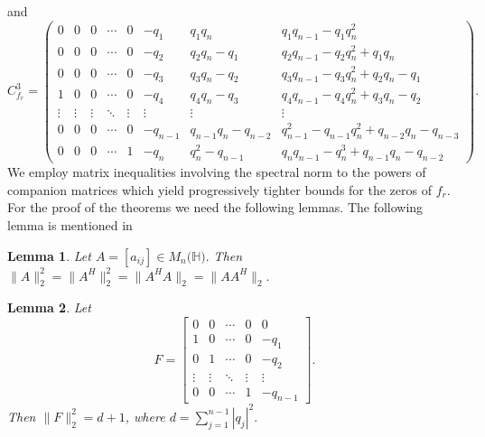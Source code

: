 \documentclass [12pt]{article}
\newtheorem{lemma}{Lemma}
\begin{document}
and
\[
C^{3}_{f_{r}} = 
\begin{pmatrix}
0 & 0 & 0 & \cdots &0& -q_{1}&q_{1}q_{n}&q_{1}q_{n-1}-q_{1}q^{2}_{n} \\
0 & 0 & 0 & \cdots &0& -q_{2} &q_{2}q_{n}-q_{1}&q_{2}q_{n-1}-q_{2}q^{2}_{n}+q_{1}q_{n}\\
0 & 0 & 0 & \cdots &0& -q_{3} &q_{3}q_{n}-q_{2}&q_{3}q_{n-1}-q_{3}q^{2}_{n}+q_{2}q_{n}-q_{1}\\
1&0&0&\cdots&0&-q_{4}&q_{4}q_{n}-q_{3}&q_{4}q_{n-1}-q_{4}q^{2}_{n}+q_{3}q_{n}-q_{2}\\
\vdots & \vdots & \vdots & \ddots & \vdots&\vdots&\vdots&\vdots \\
0 & 0 & 0 & \cdots &0 & -q_{n-1} &q_{n-1}q_{n}-q_{n-2}&q^{2}_{n-1}-q_{n-1}q^{2}_{n}+q_{n-2}q_{n}-q_{n-3}\\
0 & 0 & 0 & \cdots &1 & -q_{n} & q^{2}_{n}-q_{n-1}&q_{n}q_{n-1}-q^{3}_{n}+q_{n-1}q_{n}-q_{n-2}
\end{pmatrix}.
\] 
We employ matrix inequalities involving the spectral norm to the powers of  companion matrices which yield progressively tighter bounds for the zeros of $f_{r}.$\\


\noindent For the proof of the theorems we need the following lemmas. The following lemma is mentioned in \cite{ASS}
\begin{lemma}{\label{lemma 1}}
    Let $A= [a_{ij}]\in M_{n}(\mathbb{H)}.$ Then $\|A\|^2_{2}=\|A^{H}\|^{2}_{2}=\|A^{H}A\|_{2}=\|AA^{H}\|_{2}.$
\end{lemma}
\begin{lemma}{\label{lemma 2}}
    Let 
    \[F = 
\begin{bmatrix}
0 & 0 & \cdots & 0 & 0 \\
1 & 0 & \cdots & 0 & -q_{1} \\
0 & 1 & \cdots & 0 & -q_{2} \\
\vdots & \vdots & \ddots & \vdots & \vdots \\
0 & 0 & \cdots & 1 & -q_{n-1}
\end{bmatrix}.\]
Then $\|F\|^{2}_{2}=d+1$, where $d=\sum\limits_{j=1}^{n-1}|q_{j}|^{2}.$
\end{lemma}
\end{document}

